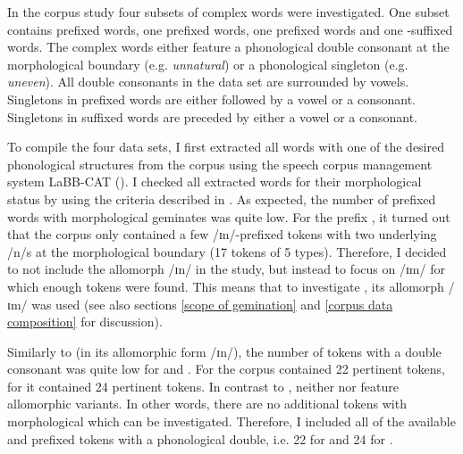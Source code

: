 In the corpus study four subsets of complex words were investigated. One subset contains prefixed words, one prefixed words,
 one prefixed words and one -suffixed words. The complex words either feature a phonological double consonant at the morphological boundary (e.g. \textit{unnatural}) or a phonological singleton (e.g. \textit{uneven}).
All double consonants in the data set are surrounded by vowels. Singletons in prefixed words are either followed by a vowel or a consonant. Singletons in suffixed words are preceded by either a vowel or a consonant.

To compile the four data sets, I first extracted all words with one of the desired phonological structures from the corpus using the speech corpus management system LaBB-CAT (\citealt{Fromont.2012,Fromont.20032015}).  
I checked all extracted words for their morphological status by using the criteria described in .
As expected, the number of prefixed words with morphological {geminates} was quite low. 
For the prefix ,
it turned out that the corpus only contained a few /ɪn/-prefixed tokens with two underlying /n/s at the morphological boundary (17 tokens of 5 types). Therefore, I decided to not include the allomorph /ɪn/ in the study, but instead to focus on /ɪm/ for which enough tokens were found. This means that to investigate , its allomorph /ɪm/ was used (see also sections \ref{scope of gemination} and \ref{corpus data composition} for discussion).

Similarly to  (in its allomorphic form /ɪn/), the number of tokens with a double consonant was quite low for  and . For  the corpus contained 22 pertinent tokens, for  it contained 24 pertinent tokens. In contrast to , neither  nor  feature allomorphic variants. In other words, there are no additional tokens with morphological  which can be investigated. Therefore, I included all of the available  and prefixed tokens with a phonological double, i.e. 22 for  and 24 for . 

